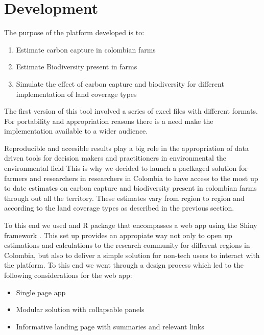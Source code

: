 \documentclass[
]{jss}
\providecommand{\tightlist}{%
  \setlength{\itemsep}{0pt}\setlength{\parskip}{0pt}}
\begin{document}
\hypertarget{development}{%
\section{Development}\label{development}}

The purpose of the platform developed is to:

\begin{enumerate}
\def\labelenumi{\arabic{enumi}.}
\tightlist
\item
  Estimate carbon capture in colombian farms
\item
  Estimate Biodiversity present in farms
\item
  Simulate the effect of carbon capture and biodiversity for different
  implementation of land coverage types
\end{enumerate}

The first version of this tool involved a series of excel files with
different formats. For portability and appropriation reasons there is a
need make the implementation available to a wider audience.

Reproducible and accesible results play a big role in the appropriation
of data driven tools for decision makers and practitioners in
environmental the environmental field This is why we decided to launch a
paclkaged solution for farmers and researchers in researchers in
Colombia to have access to the most up to date estimates on carbon
capture and biodiversity present in colombian farms through out all the
territory. These estimates vary from region to region and according to
the land coverage types as described in the previous section.

To this end we used and R package that encompasses a web app using the
Shiny framework \citet{Chang2015}. This set up provides an appropiate
way not only to open up estimations and calculations to the research
community for different regions in Colombia, but also to deliver a
simple solution for non-tech users to interact with the platform. To
this end we went through a design process which led to the following
considerations for the web app:

\begin{itemize}
\tightlist
\item
  Single page app
\item
  Modular solution with collapsable panels
\item
  Informative landing page with summaries and relevant links
\end{itemize}
\end{document}
